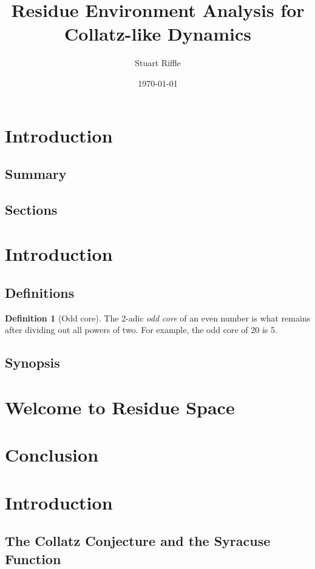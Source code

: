 \documentclass[12pt]{article}
\title{Residue Environment Analysis for Collatz-like Dynamics}
\author{Stuart Riffle}
\date{\today}
\theoremstyle{plain}
\theoremstyle{definition}
\newtheorem{definition}[theorem]{Definition}
\begin{document}
\maketitle
\begin{abstract}
\end{abstract}

\section{Introduction}
    \subsection{Summary}
    \subsection{Sections}

\section{Introduction}
    \subsection{Definitions}
        \begin{definition}[Odd core]
        The 2-adic \emph{odd core} of an even number is what remains after dividing out all powers of two. For example, the odd core of 20 is 5.
        \end{definition}

    \subsection{Synopsis}

\section{Welcome to Residue Space}
\section{Conclusion}


\section{Introduction}
\subsection{The Collatz Conjecture and the Syracuse Function}
\end{document}
